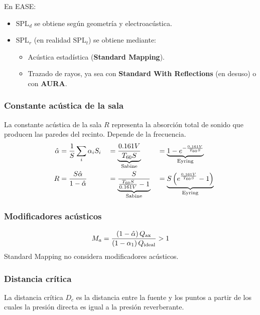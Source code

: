 \documentclass[a4paper, 8pt]{extarticle}
\begin{document}
\begin{multicols}{3}
  En EASE:
  \begin{itemize}
    \item $\text{SPL}_d$ se obtiene según geometría y electroacústica.
    \item $\text{SPL}_r$ (en realidad $\text{SPL}_t$) se obtiene mediante:
          \begin{itemize}
            \item Acústica estadística (\textbf{Standard Mapping}).
            \item Trazado de rayos, ya sea con \textbf{Standard With Reflections} (en desuso) o con \textbf{AURA}.
          \end{itemize}
  \end{itemize}
  \subsubsection{Constante acústica de la sala}
  La constante acústica de la sala $R$ representa la absorción total de sonido que producen las paredes del recinto. Depende de la frecuencia.
  \begin{align*}
     &  & \hat{\alpha} & = \frac{1}{S} \sum_{i}\alpha _i S_i       &  & = \underbrace{\frac{0.161V}{T_{60}S}} _{\text{Sabine}}                      &  & = \underbrace{1 - e ^{-\frac{0.161V}{T_{60}S}}} _{\text{Eyring}}                      \\
     &  & R            & = \frac{S \hat{\alpha}}{1 - \hat{\alpha}} &  & = \underbrace{\frac{S}{\frac{T_{60}S}{0.161 V} - 1}} _{\textnormal{Sabine}} &  & = \underbrace{S \left( e^{\frac{0.161V}{T_{60}S}} - 1 \right)} _{\textnormal{Eyring}}
  \end{align*}
  \subsubsection{Modificadores acústicos}

  \[ M_a = \frac{\left( 1 - \hat{\alpha} \right)Q _{\textnormal{ax}}}{\left( 1 - \alpha _1 \right)
    Q _{\textnormal{ideal}}} >1\]
  Standard Mapping no considera modificadores acústicos.

  \subsubsection{Distancia crítica}

  La distancia crítica $D_c$ es la distancia entre la fuente y los puntos a partir de los cuales la presión directa es igual a la presión reverberante.


\end{multicols}
\end{document}
